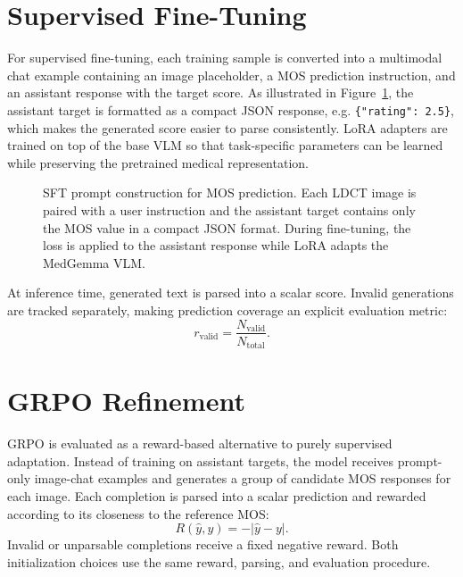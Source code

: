 \section{Supervised Fine-Tuning}
For supervised fine-tuning, each training sample is converted into a multimodal chat example containing an image placeholder, a MOS prediction instruction, and an assistant response with the target score. As illustrated in Figure~\ref{fig:sft-prompt-flow}, the assistant target is formatted as a compact JSON response, e.g. \texttt{\{"rating": 2.5\}}, which makes the generated score easier to parse consistently. LoRA adapters are trained on top of the base VLM so that task-specific parameters can be learned while preserving the pretrained medical representation.

\begin{figure}[!htbp]
  \centering
  \resizebox{\textwidth}{!}{}
  \caption{SFT prompt construction for MOS prediction. Each LDCT image is paired with a user instruction and the assistant target contains only the MOS value in a compact JSON format. During fine-tuning, the loss is applied to the assistant response while LoRA adapts the MedGemma VLM.}
  \label{fig:sft-prompt-flow}
\end{figure}

At inference time, generated text is parsed into a scalar score. Invalid generations are tracked separately, making prediction coverage an explicit evaluation metric:
\begin{equation}
  r_{\mathrm{valid}} = \frac{N_{\mathrm{valid}}}{N_{\mathrm{total}}}.
\end{equation}

\section{GRPO Refinement}
GRPO is evaluated as a reward-based alternative to purely supervised adaptation. Instead of training on assistant targets, the model receives prompt-only image-chat examples and generates a group of candidate MOS responses for each image. Each completion is parsed into a scalar prediction and rewarded according to its closeness to the reference MOS:
\begin{equation}
  R(\hat{y},y)=-|\hat{y}-y|.
\end{equation}
Invalid or unparsable completions receive a fixed negative reward. Both initialization choices use the same reward, parsing, and evaluation procedure.

